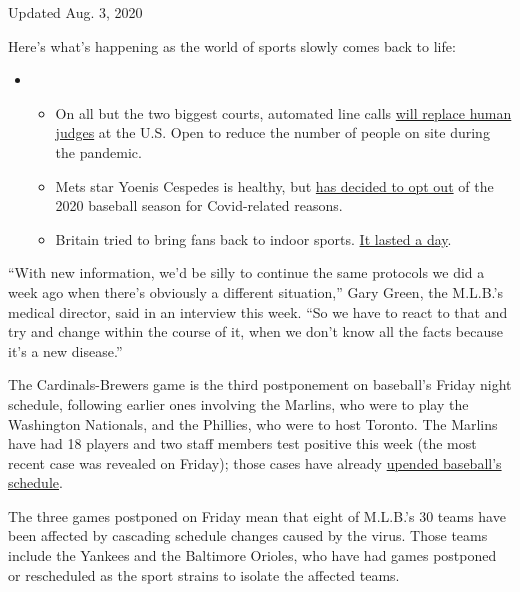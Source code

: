 Updated Aug. 3, 2020

Here's what's happening as the world of sports slowly comes back to
life:

\begin{itemize}
\item
  \begin{itemize}
  \tightlist
  \item
    On all but the two biggest courts, automated line calls
    \href{https://www.nytimes.com/2020/08/03/sports/tennis/us-open-hawkeye-line-judges.html?action=click\&pgtype=Article\&state=default\&region=MAIN_CONTENT_2\&context=storylines_keepup}{will
    replace human judges} at the U.S. Open to reduce the number of
    people on site during the pandemic.
  \item
    Mets star Yoenis Cespedes is healthy, but
    \href{https://www.nytimes.com/2020/08/02/sports/baseball/Yoenis-cespedes-opt-out-rule.html?action=click\&pgtype=Article\&state=default\&region=MAIN_CONTENT_2\&context=storylines_keepup}{has
    decided to opt out} of the 2020 baseball season for Covid-related
    reasons.
  \item
    Britain tried to bring fans back to indoor sports.
    \href{https://www.nytimes.com/2020/08/02/sports/snooker-world-championship.html?action=click\&pgtype=Article\&state=default\&region=MAIN_CONTENT_2\&context=storylines_keepup}{It
    lasted a day}.
  \end{itemize}
\end{itemize}

``With new information, we'd be silly to continue the same protocols we
did a week ago when there's obviously a different situation,'' Gary
Green, the M.L.B.'s medical director, said in an interview this week.
``So we have to react to that and try and change within the course of
it, when we don't know all the facts because it's a new disease.''

The Cardinals-Brewers game is the third postponement on baseball's
Friday night schedule, following earlier ones involving the Marlins, who
were to play the Washington Nationals, and the Phillies, who were to
host Toronto. The Marlins have had 18 players and two staff members test
positive this week (the most recent case was revealed on Friday); those
cases have already
\href{https://www.nytimes.com/2020/07/28/sports/baseball/marlins-outbreak-mlb-coronavirus.html}{upended
baseball's schedule}.

The three games postponed on Friday mean that eight of M.L.B.'s 30 teams
have been affected by cascading schedule changes caused by the virus.
Those teams include the Yankees and the Baltimore Orioles, who have had
games postponed or rescheduled as the sport strains to isolate the
affected teams.


